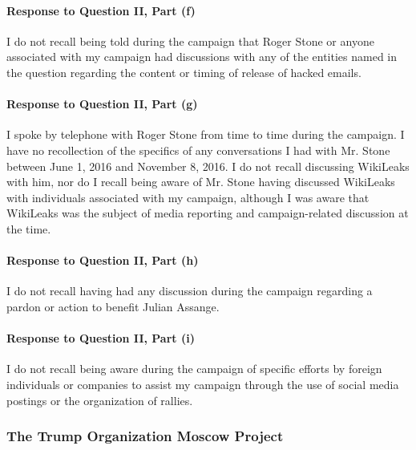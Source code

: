 \paragraph*{Response to Question II, Part (f)}

I do not recall being told during the campaign that Roger Stone or anyone associated with my campaign had discussions with any of the entities named in the question regarding the content or timing of release of hacked emails.

\paragraph*{Response to Question II, Part (g)}

I spoke by telephone with Roger Stone from time to time during the campaign.
I have no recollection of the specifics of any conversations I had with Mr. Stone between June 1, 2016 and November 8, 2016.
I do not recall discussing WikiLeaks with him, nor do I recall being aware of Mr. Stone having discussed WikiLeaks with individuals associated with my campaign, although I was aware that WikiLeaks was the subject of media reporting and campaign-related discussion at the time.

\paragraph*{Response to Question II, Part (h)}

I do not recall having had any discussion during the campaign regarding a pardon or action to benefit Julian Assange.

\paragraph*{Response to Question II, Part (i)}

I do not recall being aware during the campaign of specific efforts by foreign individuals or companies to assist my campaign through the use of social media postings or the organization of rallies.

\subsubsection{The Trump Organization Moscow Project}

